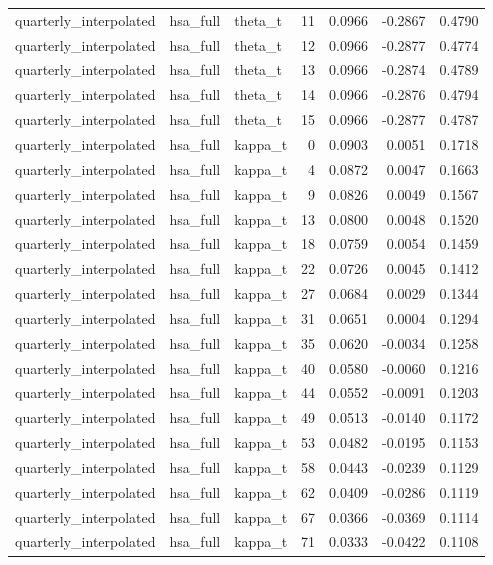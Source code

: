 \begin{tabular}{lllrrrr}
quarterly\_interpolated & hsa\_full & theta\_t & 11 & 0.0966 & -0.2867 & 0.4790 \\
quarterly\_interpolated & hsa\_full & theta\_t & 12 & 0.0966 & -0.2877 & 0.4774 \\
quarterly\_interpolated & hsa\_full & theta\_t & 13 & 0.0966 & -0.2874 & 0.4789 \\
quarterly\_interpolated & hsa\_full & theta\_t & 14 & 0.0966 & -0.2876 & 0.4794 \\
quarterly\_interpolated & hsa\_full & theta\_t & 15 & 0.0966 & -0.2877 & 0.4787 \\
quarterly\_interpolated & hsa\_full & kappa\_t & 0 & 0.0903 & 0.0051 & 0.1718 \\
quarterly\_interpolated & hsa\_full & kappa\_t & 4 & 0.0872 & 0.0047 & 0.1663 \\
quarterly\_interpolated & hsa\_full & kappa\_t & 9 & 0.0826 & 0.0049 & 0.1567 \\
quarterly\_interpolated & hsa\_full & kappa\_t & 13 & 0.0800 & 0.0048 & 0.1520 \\
quarterly\_interpolated & hsa\_full & kappa\_t & 18 & 0.0759 & 0.0054 & 0.1459 \\
quarterly\_interpolated & hsa\_full & kappa\_t & 22 & 0.0726 & 0.0045 & 0.1412 \\
quarterly\_interpolated & hsa\_full & kappa\_t & 27 & 0.0684 & 0.0029 & 0.1344 \\
quarterly\_interpolated & hsa\_full & kappa\_t & 31 & 0.0651 & 0.0004 & 0.1294 \\
quarterly\_interpolated & hsa\_full & kappa\_t & 35 & 0.0620 & -0.0034 & 0.1258 \\
quarterly\_interpolated & hsa\_full & kappa\_t & 40 & 0.0580 & -0.0060 & 0.1216 \\
quarterly\_interpolated & hsa\_full & kappa\_t & 44 & 0.0552 & -0.0091 & 0.1203 \\
quarterly\_interpolated & hsa\_full & kappa\_t & 49 & 0.0513 & -0.0140 & 0.1172 \\
quarterly\_interpolated & hsa\_full & kappa\_t & 53 & 0.0482 & -0.0195 & 0.1153 \\
quarterly\_interpolated & hsa\_full & kappa\_t & 58 & 0.0443 & -0.0239 & 0.1129 \\
quarterly\_interpolated & hsa\_full & kappa\_t & 62 & 0.0409 & -0.0286 & 0.1119 \\
quarterly\_interpolated & hsa\_full & kappa\_t & 67 & 0.0366 & -0.0369 & 0.1114 \\
quarterly\_interpolated & hsa\_full & kappa\_t & 71 & 0.0333 & -0.0422 & 0.1108 \\

\end{tabular}
